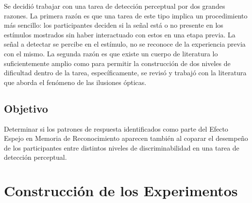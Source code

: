 Se decidió trabajar con una tarea de detección perceptual por dos grandes razones. La primera razón es que una tarea de este tipo implica un procedimiento más sencillo: los participantes deciden si la señal está o no presente en los estímulos mostrados sin haber interactuado con estos en una etapa previa. La señal a detectar se percibe en el estímulo, no se reconoce de la experiencia previa con el mismo. La segunda razón es que existe un cuerpo de literatura lo suficientemente amplio como para permitir la construcción de dos niveles de dificultad dentro de la tarea, específicamente, se revisó y trabajó con la literatura que aborda el fenómeno de las ilusiones ópticas.\\

\subsection{Objetivo}

Determinar si los patrones de respuesta identificados como parte del Efecto Espejo en Memoria de Reconocimiento aparecen también al coparar el desempeño de los participantes entre distintos niveles de discriminabilidad en una tarea de detección perceptual.\\

\section{Construcción de los Experimentos}



